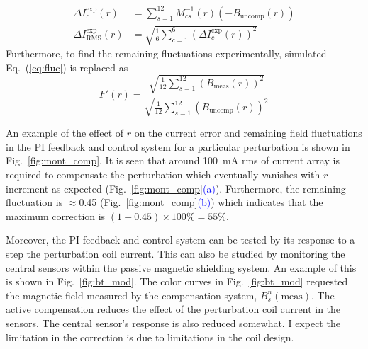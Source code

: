 \begin{align}
    \Delta I_c^{\text{exp}}(r) &= \sum_{s=1}^{12} M^{-1}_{cs}(r) (-B_{\text{uncomp}}(r))\label{eq:del_Is_exp}\\
     \Delta I_{\text{RMS}}^{\text{exp}}(r) &= \sqrt{\frac{1}{6}\sum_{c=1}^6 (\Delta I_c^{\text{exp}}(r))^2}\label{eq:delta_Iexp_rms}
\end{align}
Furthermore, to find the remaining fluctuations experimentally, simulated Eq.~(\ref{eq:fluc}) is replaced as
\begin{equation}\label{eq:fluc_exp}
   F'(r)=\frac{\sqrt{\frac{1}{12} \sum_{s=1}^{12} (B_{\text{meas}}(r))^2}}{\sqrt{\frac{1}{12} \sum_{s=1}^{12} (B_{\text{uncomp}}(r))^2}}
\end{equation}



An example of the effect of $r$ on the current error and remaining field
fluctuations in the PI feedback and control system for a particular perturbation is shown in Fig.~\ref{fig:mont_comp}. It is seen that around 100~mA rms of current array is required to compensate the perturbation
which eventually vanishes with $r$ increment as expected (Fig.~\ref{fig:mont_comp}\textcolor{blue}{(a)}). Furthermore, the remaining fluctuation is
$\approx$0.45 (Fig.~\ref{fig:mont_comp}\textcolor{blue}{(b)}) which indicates that the maximum correction is $(1-0.45)\times100\%=55\%$.






% 

Moreover, the PI feedback and control system can be tested by its response to a step the perturbation coil current. This can also be studied by monitoring the central sensors within the passive magnetic shielding system. An example of this is shown in Fig.~\ref{fig:bt_mod}. The color curves in Fig.~\ref{fig:bt_mod} requested the magnetic field measured by the compensation system, $B_s^n(\text{meas})$.  The active compensation reduces the effect of the perturbation coil current in the sensors. The central sensor's response is also reduced somewhat. I expect the limitation in the correction is due to limitations in the coil design. 

